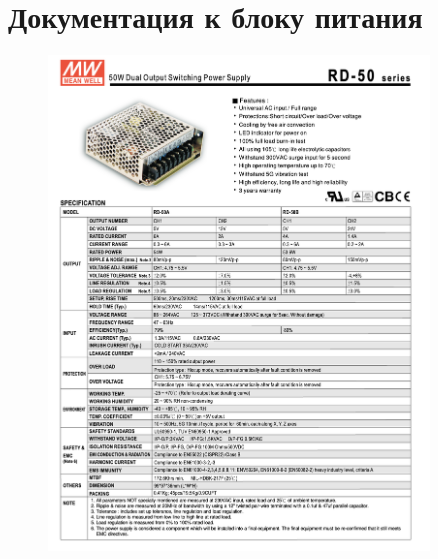 \documentclass[14pt]{extreport}
\begin{document}
\begin{sloppypar}
\chapter{Документация к блоку питания}
\label{appendbp}
\begin{figure}[ht]
	\centering
	\includegraphics[width=0.9\textwidth]{./images/bp.png}
	\label{fig:bp1}
\end{figure}



\end{sloppypar}
\end{document}
